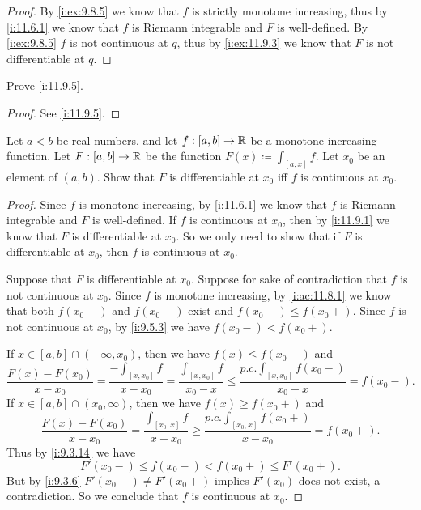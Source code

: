 \begin{proof}
  By \cref{i:ex:9.8.5} we know that \(f\) is strictly monotone increasing, thus by \cref{i:11.6.1} we know that \(f\) is Riemann integrable and \(F\) is well-defined.
  By \cref{i:ex:9.8.5} \(f\) is not continuous at \(q\), thus by \cref{i:ex:11.9.3} we know that \(F\) is not differentiable at \(q\).
\end{proof}

\begin{ex}\label{i:ex:11.9.2}
  Prove \cref{i:11.9.5}.
\end{ex}

\begin{proof}
  See \cref{i:11.9.5}.
\end{proof}

\begin{ex}\label{i:ex:11.9.3}
  Let \(a < b\) be real numbers, and let \(f : [a, b] \to \mathbb{R}\) be a monotone increasing function.
  Let \(F : [a, b] \to \mathbb{R}\) be the function \(F(x) \coloneqq \int_{[a, x]} f\).
  Let \(x_0\) be an element of \((a, b)\).
  Show that \(F\) is differentiable at \(x_0\) iff \(f\) is continuous at \(x_0\).
\end{ex}

\begin{proof}
  Since \(f\) is monotone increasing, by \cref{i:11.6.1} we know that \(f\) is Riemann integrable and \(F\) is well-defined.
  If \(f\) is continuous at \(x_0\), then by \cref{i:11.9.1} we know that \(F\) is differentiable at \(x_0\).
  So we only need to show that if \(F\) is differentiable at \(x_0\), then \(f\) is continuous at \(x_0\).

  Suppose that \(F\) is differentiable at \(x_0\).
  Suppose for sake of contradiction that \(f\) is not continuous at \(x_0\).
  Since \(f\) is monotone increasing, by \cref{i:ac:11.8.1} we know that both \(f(x_0+)\) and \(f(x_0-)\) exist and \(f(x_0-) \leq f(x_0+)\).
  Since \(f\) is not continuous at \(x_0\), by \cref{i:9.5.3} we have \(f(x_0-) < f(x_0+)\).

  If \(x \in [a, b] \cap (-\infty, x_0)\), then we have \(f(x) \leq f(x_0-)\) and
  \[
    \dfrac{F(x) - F(x_0)}{x - x_0} = \dfrac{-\int_{[x, x_0]} f}{x - x_0} = \dfrac{\int_{[x, x_0]} f}{x_0 - x} \leq \dfrac{p.c. \int_{[x, x_0]} f(x_0-)}{x_0 - x} = f(x_0-).
  \]
  If \(x \in [a, b] \cap (x_0, \infty)\), then we have \(f(x) \geq f(x_0+)\) and
  \[
    \dfrac{F(x) - F(x_0)}{x - x_0} = \dfrac{\int_{[x_0, x]} f}{x - x_0} \geq \dfrac{p.c. \int_{[x_0, x]} f(x_0+)}{x - x_0} = f(x_0+).
  \]
  Thus by \cref{i:9.3.14} we have
  \[
    F'(x_0-) \leq f(x_0-) < f(x_0+) \leq F'(x_0+).
  \]
  But by \cref{i:9.3.6} \(F'(x_0-) \neq F'(x_0+)\) implies \(F'(x_0)\) does not exist, a contradiction.
  So we conclude that \(f\) is continuous at \(x_0\).
\end{proof}

